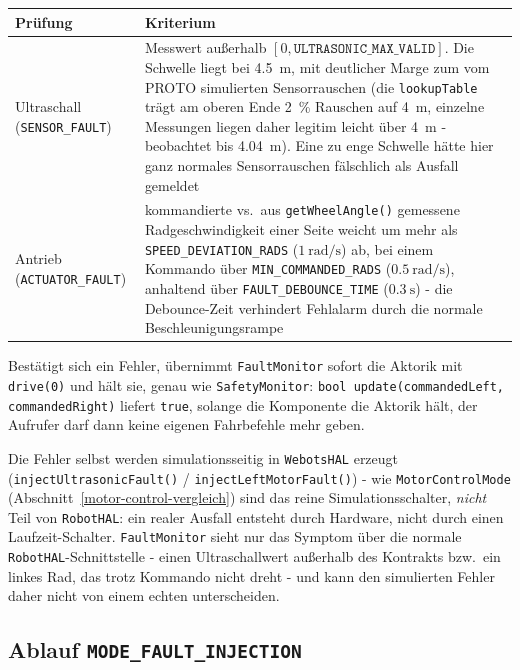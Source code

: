 \documentclass[
  a4paper,
  12pt,
  DIV=12,        %
  parskip=half,  %
  headings=small %
]{scrartcl}
\theoremstyle{definition}
\theoremstyle{definition}
\begin{document}
\begin{longtable}[]{@{}p{}p{}@{}}
\toprule
\textbf{Prüfung} & \textbf{Kriterium}\\
\midrule
\endhead
\bottomrule
\endfoot
Ultraschall (\texttt{SENSOR\_FAULT}) & Messwert außerhalb $[0,
\texttt{ULTRASONIC\_MAX\_VALID}]$. Die Schwelle liegt bei \SI{4.5}{\meter},
mit deutlicher Marge zum vom PROTO simulierten Sensorrauschen (die
\texttt{lookupTable} trägt am oberen Ende \SI{2}{\percent} Rauschen auf
\SI{4}{\meter}, einzelne Messungen liegen daher legitim leicht über
\SI{4}{\meter} - beobachtet bis \SI{4.04}{\meter}). Eine zu enge Schwelle
hätte hier ganz normales Sensorrauschen fälschlich als Ausfall gemeldet\\
Antrieb (\texttt{ACTUATOR\_FAULT}) & kommandierte vs.\ aus
\texttt{getWheelAngle()} gemessene Radgeschwindigkeit einer Seite weicht um
mehr als \texttt{SPEED\_DEVIATION\_RADS} ($\SI{1}{\radian\per\second}$) ab,
bei einem Kommando über \texttt{MIN\_COMMANDED\_RADS}
($\SI{0.5}{\radian\per\second}$), anhaltend über
\texttt{FAULT\_DEBOUNCE\_TIME} ($\SI{0.3}{\second}$) - die Debounce-Zeit
verhindert Fehlalarm durch die normale Beschleunigungsrampe\\
\end{longtable}

Bestätigt sich ein Fehler, übernimmt \texttt{FaultMonitor} sofort die
Aktorik mit \texttt{drive(0)} und hält sie, genau wie
\texttt{SafetyMonitor}: \texttt{bool update(commandedLeft, commandedRight)}
liefert \texttt{true}, solange die Komponente die Aktorik hält, der
Aufrufer darf dann keine eigenen Fahrbefehle mehr geben.

Die Fehler selbst werden simulationsseitig in \texttt{WebotsHAL} erzeugt
(\texttt{injectUltrasonicFault()} / \texttt{injectLeftMotorFault()}) - wie
\texttt{MotorControlMode} (Abschnitt~\ref{motor-control-vergleich}) sind
das reine Simulationsschalter, \emph{nicht} Teil von \texttt{RobotHAL}: ein
realer Ausfall entsteht durch Hardware, nicht durch einen
Laufzeit-Schalter. \texttt{FaultMonitor} sieht nur das Symptom über die
normale \texttt{RobotHAL}-Schnittstelle - einen Ultraschallwert außerhalb
des Kontrakts bzw.\ ein linkes Rad, das trotz Kommando nicht dreht - und
kann den simulierten Fehler daher nicht von einem echten unterscheiden.

\subsection{Ablauf \texttt{MODE\_FAULT\_INJECTION}}\label{ablauf-fault-injection}
\end{document}
